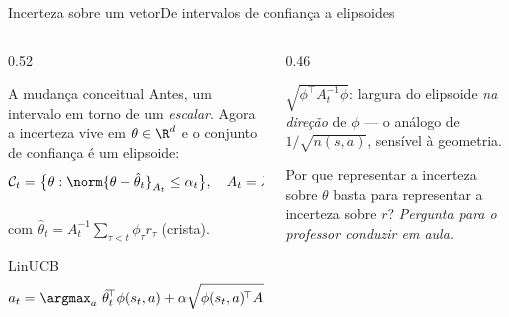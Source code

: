 \documentclass[aspectratio=169, 11pt]{beamer}
\newcommand{\paradiscussao}{\smallskip
  {\footnotesize\color{rlCinza}\itshape Pergunta para o professor conduzir em aula.}}
\newcommand{\feat}{\phi}
\begin{document}
\begin{frame}{Incerteza sobre um vetor}{De intervalos de confiança a elipsoides}
  \begin{columns}[T]
    \begin{column}{0.52\textwidth}
      \begin{defbox}{A mudança conceitual}
        Antes, um intervalo em torno de um \emph{escalar}. Agora a incerteza vive em
        $\theta \in \R^d$ e o conjunto de confiança é um \alert{elipsoide}:
        \vspace{-0.7em}
        \[
          \mathcal{C}_t = \bigl\{\theta : \norm{\theta - \hat\theta_t}_{A_t} \le \alpha_t \bigr\},
          \quad
          A_t = \lambda I + \sum_{\tau < t}\feat_\tau \feat_\tau^{\!\top},
        \]
        \vspace{-1.1em}

        com $\hat\theta_t = A_t^{-1}\sum_{\tau<t}\feat_\tau r_\tau$ (crista).
      \end{defbox}
      \begin{algbox}{LinUCB}
        \vspace{-0.9em}
        \[
          a_t = \argmax_{a}\ \hat\theta_t^{\!\top}\feat(s_t,a)
          + \alpha \sqrt{\feat(s_t,a)^{\!\top} A_t^{-1}\feat(s_t,a)}
        \]
        \vspace{-1.3em}
      \end{algbox}
    \end{column}
    \begin{column}{0.46\textwidth}
      \begin{ideiabox}
        $\sqrt{\feat^{\!\top}A_t^{-1}\feat}$: largura do elipsoide \emph{na direção} de
        $\feat$ --- o análogo de $1/\sqrt{n(s,a)}$, sensível à geometria.
      \end{ideiabox}
      \begin{quizbox}{}
        Por que representar a incerteza sobre $\theta$ basta para representar a
        incerteza sobre $r$?
        \paradiscussao
      \end{quizbox}
    \end{column}
  \end{columns}
\end{frame}
\end{document}
